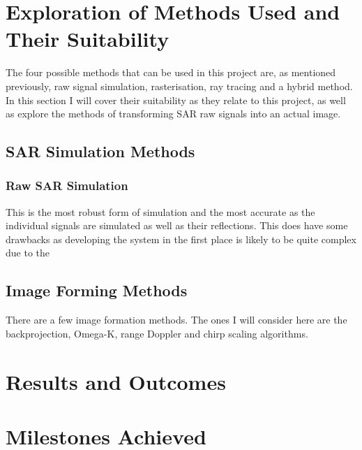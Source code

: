 \section{Exploration of Methods Used and Their Suitability}
\label{sec:method_exploration}
The four possible methods that can be used in this project are, as mentioned previously, raw signal simulation, rasterisation, ray tracing and a hybrid method. In this section I will cover their suitability as they relate to this project, as well as explore the methods of transforming SAR raw signals into an actual image.
\subsection{SAR Simulation Methods}
\subsubsection{Raw SAR Simulation}
This is the most robust form of simulation and the most accurate as the individual signals are simulated as well as their reflections. This does have some drawbacks as developing the system in the first place is likely to be quite complex due to the 
\subsection{Image Forming Methods}
There are a few image formation methods. The ones I will consider here are the backprojection, Omega-K, range Doppler and chirp scaling algorithms. 
\section{Results and Outcomes}
\section{Milestones Achieved}